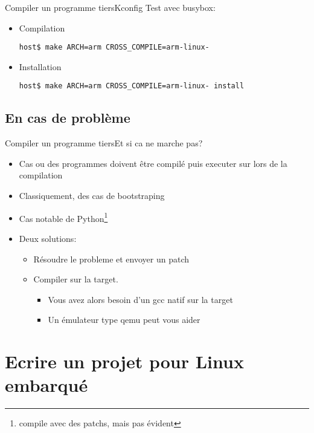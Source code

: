 \begin{frame}[fragile=singleslide]{Compiler un programme tiers}{Kconfig}
  Test avec busybox:
  \begin{itemize}
  \item Compilation
\begin{lstlisting}
host$ make ARCH=arm CROSS_COMPILE=arm-linux- 
\end{lstlisting} %
  \item Installation
\begin{lstlisting}
host$ make ARCH=arm CROSS_COMPILE=arm-linux- install
\end{lstlisting} %
  \end{itemize}
\end{frame}

\subsection{En cas de problème}

\begin{frame}{Compiler un programme tiers}{Et si ca ne marche pas?}
  \begin{itemize}
  \item Cas ou  des programmes doivent être compilé  puis executer sur
    lors de la compilation
  \item Classiquement, des cas de bootstraping
  \item Cas  notable de Python\footnote{compile avec  des patchs, mais
      pas évident}
  \item Deux solutions:
    \begin{itemize}
    \item Résoudre le probleme et envoyer un patch
    \item Compiler sur la target. 
      \begin{itemize}
      \item Vous avez alors besoin d'un gcc natif sur la target
      \item Un émulateur type qemu peut vous aider
      \end{itemize}
    \end{itemize}
  \end{itemize}
\end{frame}

\section{Ecrire un projet pour Linux embarqué}

